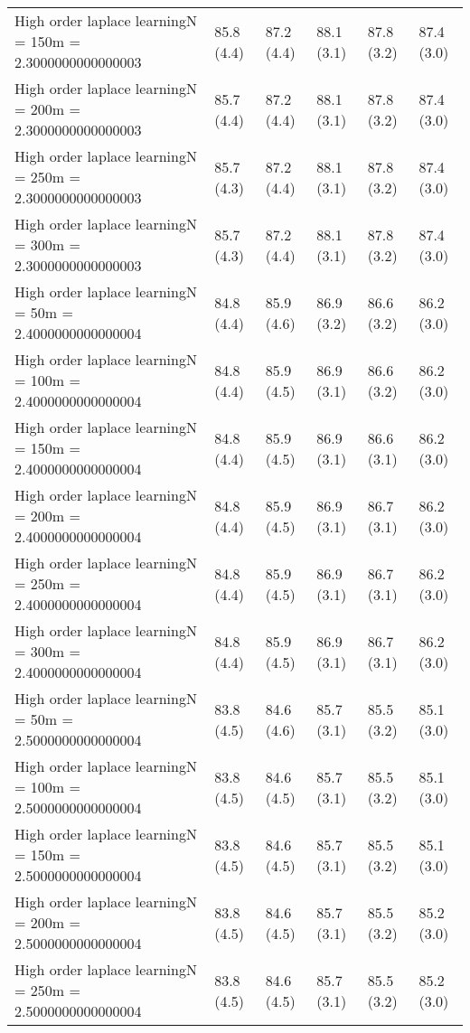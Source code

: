 \documentclass{article}
\begin{document}
\begin{table*}[t!]
\begin{center}
\begin{small}
\begin{sc}
\begin{tabular}{llllll}
High order laplace learningN = 150m = 2.3000000000000003&85.8 (4.4)      &87.2 (4.4)      &88.1 (3.1)      &87.8 (3.2)      &87.4 (3.0)      \\
High order laplace learningN = 200m = 2.3000000000000003&85.7 (4.4)      &87.2 (4.4)      &88.1 (3.1)      &87.8 (3.2)      &87.4 (3.0)      \\
High order laplace learningN = 250m = 2.3000000000000003&85.7 (4.3)      &87.2 (4.4)      &88.1 (3.1)      &87.8 (3.2)      &87.4 (3.0)      \\
High order laplace learningN = 300m = 2.3000000000000003&85.7 (4.3)      &87.2 (4.4)      &88.1 (3.1)      &87.8 (3.2)      &87.4 (3.0)      \\
High order laplace learningN = 50m = 2.4000000000000004&84.8 (4.4)      &85.9 (4.6)      &86.9 (3.2)      &86.6 (3.2)      &86.2 (3.0)      \\
High order laplace learningN = 100m = 2.4000000000000004&84.8 (4.4)      &85.9 (4.5)      &86.9 (3.1)      &86.6 (3.2)      &86.2 (3.0)      \\
High order laplace learningN = 150m = 2.4000000000000004&84.8 (4.4)      &85.9 (4.5)      &86.9 (3.1)      &86.6 (3.1)      &86.2 (3.0)      \\
High order laplace learningN = 200m = 2.4000000000000004&84.8 (4.4)      &85.9 (4.5)      &86.9 (3.1)      &86.7 (3.1)      &86.2 (3.0)      \\
High order laplace learningN = 250m = 2.4000000000000004&84.8 (4.4)      &85.9 (4.5)      &86.9 (3.1)      &86.7 (3.1)      &86.2 (3.0)      \\
High order laplace learningN = 300m = 2.4000000000000004&84.8 (4.4)      &85.9 (4.5)      &86.9 (3.1)      &86.7 (3.1)      &86.2 (3.0)      \\
High order laplace learningN = 50m = 2.5000000000000004&83.8 (4.5)      &84.6 (4.6)      &85.7 (3.1)      &85.5 (3.2)      &85.1 (3.0)      \\
High order laplace learningN = 100m = 2.5000000000000004&83.8 (4.5)      &84.6 (4.5)      &85.7 (3.1)      &85.5 (3.2)      &85.1 (3.0)      \\
High order laplace learningN = 150m = 2.5000000000000004&83.8 (4.5)      &84.6 (4.5)      &85.7 (3.1)      &85.5 (3.2)      &85.1 (3.0)      \\
High order laplace learningN = 200m = 2.5000000000000004&83.8 (4.5)      &84.6 (4.5)      &85.7 (3.1)      &85.5 (3.2)      &85.2 (3.0)      \\
High order laplace learningN = 250m = 2.5000000000000004&83.8 (4.5)      &84.6 (4.5)      &85.7 (3.1)      &85.5 (3.2)      &85.2 (3.0)      \\

\end{tabular}
\end{sc}
\end{small}
\end{center}
\end{table*}
\end{document}
